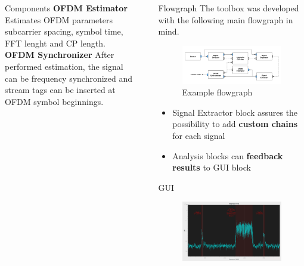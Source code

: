 \documentclass{beamer}
\begin{document}
\begin{frame}
\begin{columns}[t]
\begin{column}{0.33\textwidth}
\begin{block}{Components}
\textbf{OFDM Estimator}
Estimates OFDM parameters subcarrier spacing, symbol time, FFT lenght and CP length.\\[0.5em]

\textbf{OFDM Synchronizer}
After performed estimation, the signal can be frequency synchronized and stream tags can be inserted at OFDM symbol beginnings.
      \end{block}
    \end{column}
    \begin{column}{0.01\textwidth}
    \end{column}
    \begin{column}{0.66\textwidth}
      \begin{block}{Flowgraph}
        The toolbox was developed with the following main flowgraph in mind.
        \begin{figure}
          \includegraphics[width=\textwidth]{figures/flowgraph}
          \caption{Example flowgraph}
        \end{figure}
        \begin{itemize}
          \item Signal Extractor block assures the possibility to add \textbf{custom chains} for each signal 
          \item Analysis blocks can \textbf{feedback results} to GUI block
        \end{itemize}
      \end{block}
      \begin{block}{GUI}
      \begin{figure}
      	\includegraphics[width=\textwidth]{figures/gui.png}

\end{figure}
\end{block}
\end{column}
\end{columns}
\end{frame}
\end{document}
